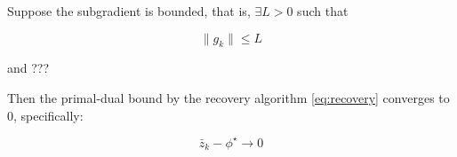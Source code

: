 \documentclass[../main]{subfiles}
\begin{document}
\begin{theorem} \label{theorem:primal}

  Suppose the subgradient is bounded, that is, \(\exists L > 0\) such that

  \begin{equation}\label{eq:bounded_subgrad}
    \|g_k\| \le L
  \end{equation}

  and
  ???

  Then the primal-dual bound by the recovery algorithm \eqref{eq:recovery} converges to \(0\), specifically:

  \[\bar z_k - \phi^\star \to 0\]

\end{theorem}
\end{document}
